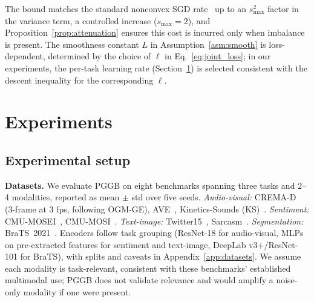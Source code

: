 \documentclass{article}
\begin{document}
The bound matches the standard nonconvex SGD rate~\citep{ghadimi2013sgd} up to an $s_{\max}^2$ factor in the variance term, a controlled increase ($s_{\max}=2$), and Proposition~\ref{prop:attenuation} ensures this cost is incurred only when imbalance is present. The smoothness constant $L$ in Assumption~\ref{asm:smooth} is loss-dependent, determined by the choice of $\ell$ in Eq.~\eqref{eq:joint_loss}; in our experiments, the per-task learning rate (Section~\ref{sec:experiments}) is selected consistent with the descent inequality for the corresponding $\ell$.


\section{Experiments}
\label{sec:experiments}
\vspace{-1.2em}

\subsection{Experimental setup}
\label{sec:datasets}

\textbf{Datasets.}
We evaluate PGGB on eight benchmarks spanning three tasks and 2--4 modalities, reported as mean $\pm$ std over five seeds. \emph{Audio-visual:} CREMA-D~\citep{cao2014cremad} (3-frame at 3 fps, following OGM-GE), AVE~\citep{tian2018ave}, Kinetics-Sounds (KS)~\citep{arandjelovic2017kinetics}. \emph{Sentiment:} CMU-MOSEI~\citep{zadeh2018mosei}, CMU-MOSI~\citep{zadeh2016mosi}. \emph{Text-image:} Twitter15~\citep{yu2019tombert, zhang2018adaptive}, Sarcasm~\citep{cai2019sarcasm}. \emph{Segmentation:} BraTS~2021~\citep{baid2021brats}. Encoders follow task grouping (ResNet-18 for audio-visual, MLPs on pre-extracted features for sentiment and text-image, DeepLab v3+/ResNet-101 for BraTS), with splits and caveats in Appendix~\ref{app:datasets}. We assume each modality is task-relevant, consistent with these benchmarks' established multimodal use; PGGB does not validate relevance and would amplify a noise-only modality if one were present.
\end{document}
